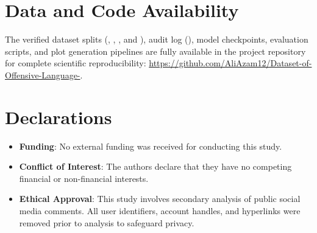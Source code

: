 \documentclass[11pt,a4paper]{article}
\begin{document}
\section*{Data and Code Availability}
The verified dataset splits (, , , and ), audit log (), model checkpoints, evaluation scripts, and plot generation pipelines are fully available in the project repository for complete scientific reproducibility: \url{https://github.com/AliAzam12/Dataset-of-Offensive-Language-}.

\section*{Declarations}
\begin{itemize}
    \item \textbf{Funding}: No external funding was received for conducting this study.
    \item \textbf{Conflict of Interest}: The authors declare that they have no competing financial or non-financial interests.
    \item \textbf{Ethical Approval}: This study involves secondary analysis of public social media comments. All user identifiers, account handles, and hyperlinks were removed prior to analysis to safeguard privacy.
\end{itemize}



\end{document}
